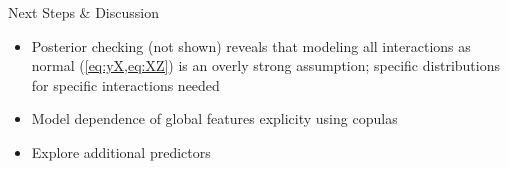 \begin{block}{Next Steps \& Discussion}
    \begin{itemize}
        \item Posterior checking (not shown) reveals that modeling all interactions as normal (\cref{eq:yX,eq:XZ}) is an overly strong assumption; specific distributions for specific interactions needed
        \item Model dependence of global features explicity using copulas \cite[\ie][]{Genest2007}
        \item Explore additional predictors
    \end{itemize}
\end{block}
